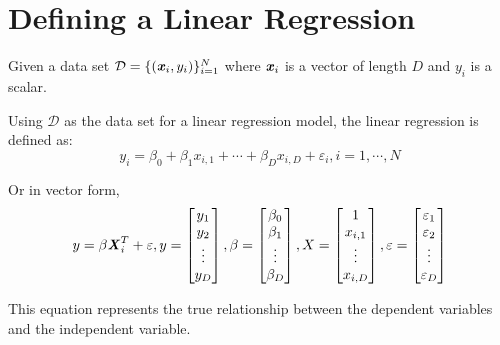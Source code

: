 \section{Defining a Linear Regression}
Given a data set $\mathcal{D}=\{(\textbf{\textit{x}}_i,y_i)\}_{i=1}^{N}$ where $\textbf{\textit{x}}_i$ is a vector of length $D$ and $y_i$ is a scalar.

Using $\mathcal{D}$ as the data set for a linear regression model, the linear regression is defined as:
\[y_i=\beta_0+\beta_1x_{i,1}+\cdots+\beta_Dx_{i,D}+\varepsilon_i,i=1,\cdots,N\]

Or in vector form,
\[
    y=\beta\textbf{\textit{X}}_i^T+\varepsilon,
    y=\begin{bmatrix}
        y_1\\
        y_2\\
        \vdots\\
        y_D
    \end{bmatrix},
    \beta=\begin{bmatrix}
        \beta_0 \\
        \beta_1 \\
        \vdots \\
        \beta_D
    \end{bmatrix},
    X=\begin{bmatrix}
        1 \\
        x_{i,1} \\
        \vdots \\
        x_{i,D}
    \end{bmatrix},
    \varepsilon=\begin{bmatrix}
        \varepsilon_1\\
        \varepsilon_2\\
        \vdots\\
        \varepsilon_D
    \end{bmatrix}
\]

This equation represents the true relationship between the dependent variables and the independent variable.